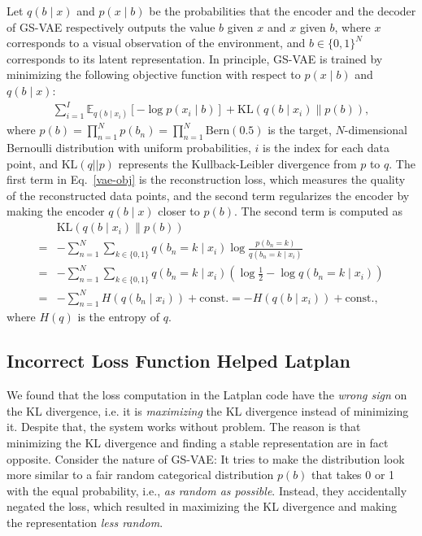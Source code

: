 
Let $q(b \mid x)$ and $p(x \mid b)$ be the probabilities that the encoder and the decoder of GS-VAE respectively outputs the value $b$ given $x$ and $x$ given $b$,
where $x$ corresponds to a visual observation of the environment, and $b\in\{0,1\}^N$ corresponds to its latent representation.
In principle, GS-VAE is trained by minimizing the following objective function with respect to $p(x \mid b)$ and $q(b\mid x)$:
\begin{align}
\label{vae-obj} \sum_{i=1}^I \mathbb{E}_{q(b\mid x_i)}\left[-\log p(x_i\mid b)\right] + \mathrm{KL}(q(b\mid x_i) \parallel p(b)),
\end{align}
where $p(b) = \prod_{n=1}^N p(b_n) = \prod_{n=1}^N \mathrm{Bern}(0.5)$ is the target, $N$-dimensional Bernoulli distribution with uniform probabilities, 
$i$ is the index for each data point, and $\mathrm{KL}(q || p)$ represents the Kullback-Leibler divergence from $p$ to $q$.
The first term in Eq.~\eqref{vae-obj} is the reconstruction loss, which measures the quality of the reconstructed data points,
and the second term regularizes the encoder by making the encoder $q(b\mid x)$ closer to $p(b)$.
The second term is computed as
\begin{align*}
 &{\mathrm{KL}}(q(b\mid x_i) \parallel p(b)) \\
= & - \sum_{n=1}^N \sum_{k\in\{0,1\}}q(b_{n}=k \mid x_i) \log\frac{p(b_{n}=k)}{q(b_{n}=k \mid x_i)}\\
=& - \sum_{n=1}^N \sum_{k\in\{0,1\}}q(b_{n}=k \mid x_i) \left(\log \frac{1}{2} - \log{q(b_{n}=k \mid x_i)}\right)\\
=& - \sum_{n=1}^N H(q(b_n\mid x_i)) + \mathrm{const.} = -H(q(b \mid x_i)) + \mathrm{const.},
\end{align*}
where $H(q)$ is the entropy of $q$.

\subsection{Incorrect Loss Function Helped Latplan}

We found that the loss computation in the Latplan code have the \emph{wrong sign} on the KL divergence,
i.e. it is \emph{maximizing} the KL divergence instead of minimizing it.
Despite that, the system works without problem.
% 
The reason is that minimizing the KL divergence and finding a stable representation are in fact opposite.
Consider the nature of GS-VAE:
It tries to make the distribution look more similar to a fair random categorical distribution $p(b)$
that takes 0 or 1 with the equal probability, i.e., \emph{as random as possible}.
Instead, they accidentally negated the loss, which resulted in
maximizing the KL divergence and making the representation \emph{less random}.

